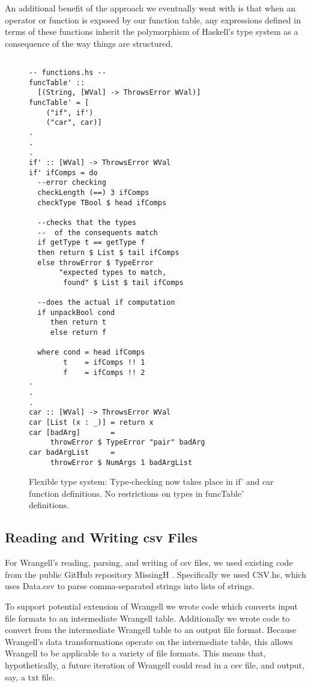 \documentclass[preprint,nocopyrightspace]{sig-alternate}
\begin{document}
An additional benefit of the approach we eventually went with is that when an operator or function is exposed by our function table, any expressions defined in terms of these functions inherit the polymorphism of Haskell's type system as a consequence of the way things are structured.
\begin{figure}
\caption{Flexible type system: Type-checking now takes place in if' and car function definitions. No restrictions on types in funcTable' definitions.}
\begin{lstlisting}

-- functions.hs --
funcTable' :: 
  [(String, [WVal] -> ThrowsError WVal)]
funcTable' = [  
    ("if", if')
    ("car", car)]
.
.
.
if' :: [WVal] -> ThrowsError WVal 
if' ifComps = do
  --error checking
  checkLength (==) 3 ifComps
  checkType TBool $ head ifComps

  --checks that the types 
  --  of the consequents match
  if getType t == getType f
  then return $ List $ tail ifComps
  else throwError $ TypeError 
       "expected types to match, 
        found" $ List $ tail ifComps

  --does the actual if computation
  if unpackBool cond 
     then return t 
     else return f

  where cond = head ifComps
        t    = ifComps !! 1
        f    = ifComps !! 2
.
.
.
car :: [WVal] -> ThrowsError WVal
car [List (x : _)] = return x
car [badArg]       = 
     throwError $ TypeError "pair" badArg
car badArgList     = 
     throwError $ NumArgs 1 badArgList

\end{lstlisting} 
\label{fig:flexType}
\end{figure}

\subsection{Reading and Writing csv Files}
For Wrangell's reading, parsing, and writing of csv files, we used  existing code from the public GitHub repository MissingH \cite{dataCSV}. Specifically we used CSV.hs, which uses Data.csv to parse comma-separated strings into lists of strings. 

To support potential extension of Wrangell we wrote code which converts input file formats to an intermediate Wrangell table. Additionally we wrote code to convert from the intermediate Wrangell table to an output file format. Because Wrangell's data transformations operate on the intermediate table, this allows Wrangell to be applicable to a variety of file formats. This means that, hypothetically, a future iteration of Wrangell could read in a csv file, and output, say, a txt file. 
\end{document}

